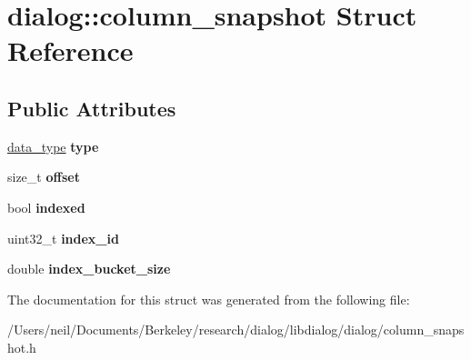 \hypertarget{structdialog_1_1column__snapshot}{}\section{dialog\+:\+:column\+\_\+snapshot Struct Reference}
\label{structdialog_1_1column__snapshot}
\subsection*{Public Attributes}
\begin{DoxyCompactItemize}
\item 
\mbox{\label{structdialog_1_1column__snapshot_a7760426f26ee1000cbe045e570ce8bb6}} 
\hyperlink{structdialog_1_1data__type}{data\+\_\+type} {\bfseries type}
\item 
\mbox{\label{structdialog_1_1column__snapshot_af813309cb5a6364642c786183dd28667}} 
size\+\_\+t {\bfseries offset}
\item 
\mbox{\label{structdialog_1_1column__snapshot_a8962d53455d80d2c1544406d40d74560}} 
bool {\bfseries indexed}
\item 
\mbox{\label{structdialog_1_1column__snapshot_a1ae01e36e383f8ce8fb7ebfa145e2727}} 
uint32\+\_\+t {\bfseries index\+\_\+id}
\item 
\mbox{\label{structdialog_1_1column__snapshot_aebb28f4cf6ee211f214cc5496817239c}} 
double {\bfseries index\+\_\+bucket\+\_\+size}
\end{DoxyCompactItemize}


The documentation for this struct was generated from the following file\+:\begin{DoxyCompactItemize}
\item 
/\+Users/neil/\+Documents/\+Berkeley/research/dialog/libdialog/dialog/column\+\_\+snapshot.\+h\end{DoxyCompactItemize}
